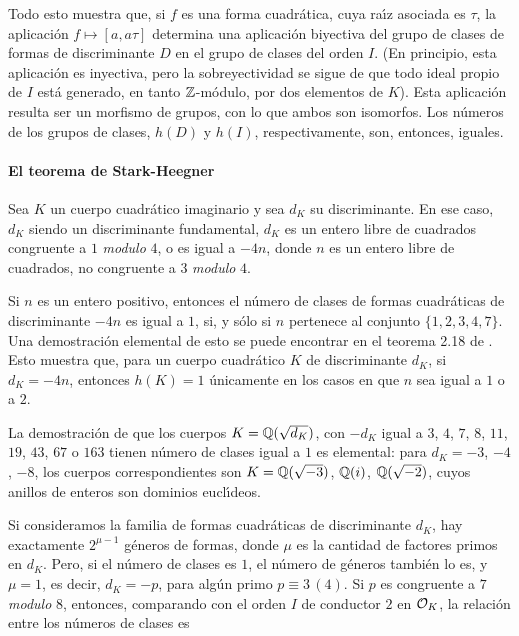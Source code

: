 Todo esto muestra que, si $f$ es una forma cuadr\'{a}tica, cuya
ra\'{\i}z asociada es $\tau$, la aplicaci\'{o}n
$f\mapsto[a,a\tau]$ determina una aplicaci\'{o}n biyectiva
del grupo de clases de formas de discriminante $D$ en el grupo de clases del
orden $I$. (En principio, esta aplicaci\'{o}n es inyectiva, pero la
sobreyectividad se sigue de que todo ideal propio de $I$ est\'{a} generado,
en tanto $\bb{Z}$-m\'{o}dulo, por dos elementos de $K$). Esta
aplicaci\'{o}n resulta ser un morfismo de grupos, con lo que
ambos son isomorfos. Los n\'{u}meros de los grupos de clases, $h(D)$ y $h(I)$,
respectivamente, son, entonces, iguales.

\paragraph{El teorema de Stark-Heegner}
Sea $K$ un cuerpo cuadr\'{a}tico imaginario y sea $d_{K}$ su
discriminante. En ese caso, $d_{K}$ siendo un discriminante
fundamental, $d_{K}$ es un entero libre de cuadrados congruente a
$1$ \textit{modulo} $4$, o es igual a $-4n$, donde $n$ es un
entero libre de cuadrados, no congruente a $3$ \textit{modulo} $4$.

Si $n$ es un entero positivo, entonces el n\'{u}mero de clases de
formas cuadr\'{a}ticas de discriminante
$-4n$ es igual a $1$, si, y s\'{o}lo si $n$ pertenece al conjunto
$\{ 1,2,3,4,7 \}$. Una demostraci\'{o}n elemental de esto se puede
encontrar en el teorema 2.18 de \cite{cox}. Esto muestra que, para
un cuerpo cuadr\'{a}tico $K$ de discriminante $d_{K}$, si
$d_{K}=-4n$, entonces $h(K)=1$ \'{u}nicamente en los casos en que
$n$ sea igual a $1$ o a $2$.

La demostraci\'{o}n de que los cuerpos $K=\bb{Q}(\sqrt{d_{K}})$,
con $-d_{K}$ igual a $3$, $4$, $7$, $8$, $11$, $19$, $43$, $67$ o $163$ tienen
n\'{u}mero de clases igual a $1$ es elemental: para $d_{K}=-3$, $-4$, $-8$,
los cuerpos correspondientes son
$K=\bb{Q}(\sqrt{-3})$, $\bb{Q}(i)$, $\bb{Q}(\sqrt{-2})$, cuyos anillos de
enteros son dominios eucl\'{\i}deos.

Si consideramos la familia de formas cuadr\'{a}ticas de discriminante $d_{K}$,
hay exactamente $2^{\mu-1}$ g\'{e}neros de formas, donde $\mu$ es la cantidad de
factores primos en $d_{K}$. Pero, si el n\'{u}mero de clases es $1$, el n\'{u}mero
de g\'{e}neros tambi\'{e}n lo es, y $\mu=1$, es decir, $d_{K}=-p$, para alg\'{u}n
primo $p\equiv 3\,(4)$. Si $p$ es congruente a $7$ \textit{modulo} $8$, entonces,
comparando con el orden $I$ de conductor $2$ en $\cal{O}_{K}$, la relaci\'{o}n
entre los n\'{u}meros de clases es

